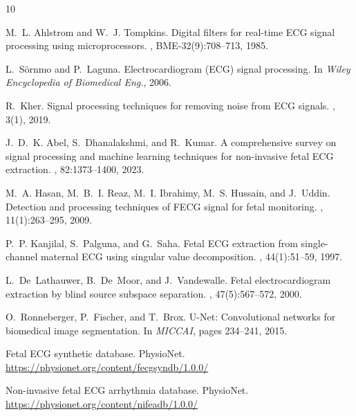 \documentclass[10pt,twocolumn,letterpaper]{article}
\begin{document}
{\small

\begin{thebibliography}{10}

M.~L. Ahlstrom and W.~J. Tompkins.
\newblock Digital filters for real-time ECG signal processing using microprocessors.
, BME-32(9):708--713, 1985.

L.~S\"{o}rnmo and P.~Laguna.
\newblock Electrocardiogram (ECG) signal processing.
\newblock In {\em Wiley Encyclopedia of Biomedical Eng.}, 2006.

R.~Kher.
\newblock Signal processing techniques for removing noise from ECG signals.
, 3(1), 2019.

J.~D.~K. Abel, S.~Dhanalakshmi, and R.~Kumar.
\newblock A comprehensive survey on signal processing and machine learning techniques for non-invasive fetal ECG extraction.
, 82:1373--1400, 2023.

M.~A. Hasan, M.~B.~I. Reaz, M.~I. Ibrahimy, M.~S. Hussain, and J.~Uddin.
\newblock Detection and processing techniques of FECG signal for fetal monitoring.
, 11(1):263--295, 2009.

P.~P. Kanjilal, S.~Palguna, and G.~Saha.
\newblock Fetal ECG extraction from single-channel maternal ECG using singular value decomposition.
, 44(1):51--59, 1997.

L.~De~Lathauwer, B.~De~Moor, and J.~Vandewalle.
\newblock Fetal electrocardiogram extraction by blind source subspace separation.
, 47(5):567--572, 2000.

O.~Ronneberger, P.~Fischer, and T.~Brox.
\newblock U-Net: Convolutional networks for biomedical image segmentation.
\newblock In {\em MICCAI}, pages 234--241, 2015.

Fetal ECG synthetic database.
\newblock PhysioNet. \url{https://physionet.org/content/fecgsyndb/1.0.0/}

Non-invasive fetal ECG arrhythmia database.
\newblock PhysioNet. \url{https://physionet.org/content/nifeadb/1.0.0/}

\end{thebibliography}
}
\end{document}
